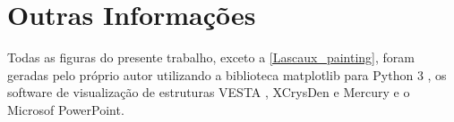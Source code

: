 		
\section{Outras Informações}

	Todas as figuras do presente trabalho, exceto a \autoref{Lascaux_painting}, foram geradas pelo próprio autor utilizando a biblioteca matplotlib para Python 3 \cite{hunter2007matplotlib}, os software de visualização de estruturas VESTA \cite{momma2011vesta}, XCrysDen \cite{kokalj1999xcrysden} e Mercury \cite{macrae2006mercury} e o Microsof PowerPoint. 
